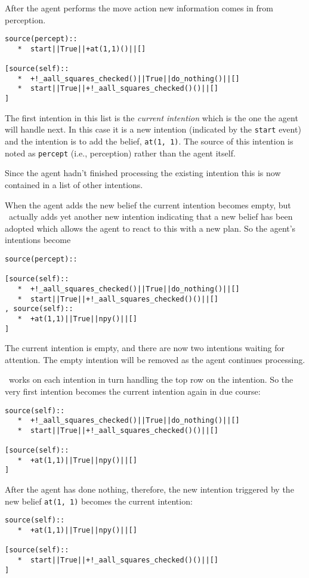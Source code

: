 \documentclass[a4]{article}
\begin{document}
After the agent performs the move action new information comes in from perception.

\begin{verbatim}
source(percept):: 
   *  start||True||+at(1,1)()||[]

[source(self):: 
   *  +!_aall_squares_checked()||True||do_nothing()||[]
   *  start||True||+!_aall_squares_checked()()||[]
] 
\end{verbatim}
The first intention in this list is the \emph{current intention} which is the one the agent will handle next.  In this case it is a new intention (indicated by the \texttt{start} event) and the intention is to add the belief, \texttt{at(1, 1)}.  The source of this intention is noted as \texttt{percept} (i.e., perception) rather than the agent itself.

Since the agent hadn't finished processing the existing intention this is now contained in a list of other intentions.

When the agent adds the new belief the current intention becomes empty, but \gwendolen\ actually adds yet another new intention indicating that a new belief has been adopted which allows the agent to react to this with a new plan.  So the agent's intentions become
\begin{verbatim}
source(percept):: 

[source(self):: 
   *  +!_aall_squares_checked()||True||do_nothing()||[]
   *  start||True||+!_aall_squares_checked()()||[]
, source(self):: 
   *  +at(1,1)||True||npy()||[]
] 
\end{verbatim}
The current intention is empty, and there are now two intentions waiting for attention.  The empty intention will be removed as the agent continues processing.

\gwendolen\ works on each intention in turn handling the top row on the intention.  So the very first intention becomes the current intention again in due course:
\begin{verbatim}
source(self):: 
   *  +!_aall_squares_checked()||True||do_nothing()||[]
   *  start||True||+!_aall_squares_checked()()||[]

[source(self):: 
   *  +at(1,1)||True||npy()||[]
] 
\end{verbatim}

After the agent has done nothing, therefore, the new intention triggered by the new belief \texttt{at(1, 1)} becomes the current intention:
\begin{verbatim}
source(self):: 
   *  +at(1,1)||True||npy()||[]

[source(self):: 
   *  start||True||+!_aall_squares_checked()()||[]
] 
\end{verbatim}
\end{document}
